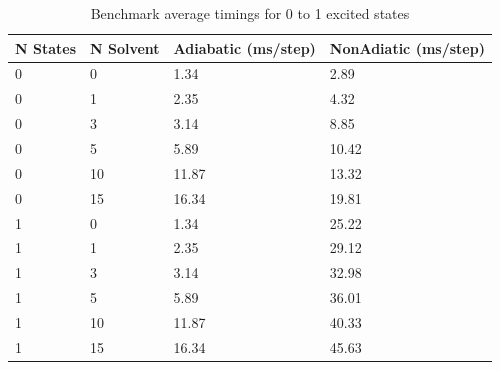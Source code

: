 \begin{table}[H]
      \caption{Benchmark average timings for 0 to 1 excited states}
      \label{table:benchmarks1}
      \begin{tabularx}{\textwidth}{XXXX}\hline
N States & N Solvent & Adiabatic (ms/step) & NonAdiatic (ms/step)\\\hline
0        & 0         &  1.34 & 2.89\\
0        & 1         &  2.35 & 4.32\\
0        & 3         &  3.14 & 8.85\\
0        & 5         &  5.89 & 10.42\\
0        & 10        & 11.87 & 13.32\\
0        & 15        & 16.34 & 19.81\\
1        & 0         &  1.34 & 25.22\\
1        & 1         &  2.35 & 29.12\\
1        & 3         &  3.14 & 32.98\\
1        & 5         &  5.89 & 36.01\\
1        & 10        & 11.87 & 40.33\\
1        & 15        & 16.34 & 45.63\\\hline
      \end{tabularx}
    \end{table}

